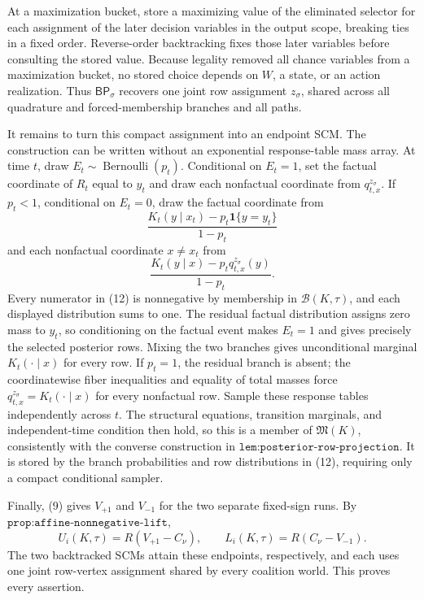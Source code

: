 At a maximization bucket, store a maximizing value of the eliminated selector for each assignment of the later decision variables in the output scope, breaking ties in a fixed order.  Reverse-order backtracking fixes those later variables before consulting the stored value.  Because legality removed all chance variables from a maximization bucket, no stored choice depends on \(W\), a state, or an action realization.  Thus \(\mathsf{BP}_\sigma\) recovers one joint row assignment \(z_\sigma\), shared across all quadrature and forced-membership branches and all paths.

It remains to turn this compact assignment into an endpoint SCM.  The construction can be written without an exponential response-table mass array.  At time \(t\), draw \(E_t\sim\operatorname{Bernoulli}(p_t)\).  Conditional on \(E_t=1\), set the factual coordinate of \(R_t\) equal to \(y_t\) and draw each nonfactual coordinate from \(q^{z_\sigma}_{t,x}\).  If \(p_t<1\), conditional on \(E_t=0\), draw the factual coordinate from
\[
 \frac{K_t(y\mid x_t)-p_t\mathbf 1\{y=y_t\}}{1-p_t}
\]
and each nonfactual coordinate \(x\ne x_t\) from
\[
 \frac{K_t(y\mid x)-p_tq^{z_\sigma}_{t,x}(y)}{1-p_t}.
 \tag{12}
\]
Every numerator in (12) is nonnegative by membership in \(\mathcal B(K,\tau)\), and each displayed distribution sums to one.  The residual factual distribution assigns zero mass to \(y_t\), so conditioning on the factual event makes \(E_t=1\) and gives precisely the selected posterior rows.  Mixing the two branches gives unconditional marginal \(K_t(\cdot\mid x)\) for every row.  If \(p_t=1\), the residual branch is absent; the coordinatewise fiber inequalities and equality of total masses force \(q^{z_\sigma}_{t,x}=K_t(\cdot\mid x)\) for every nonfactual row.  Sample these response tables independently across \(t\).  The structural equations, transition marginals, and independent-time condition then hold, so this is a member of \(\mathfrak M(K)\), consistently with the converse construction in \(\texttt{lem:posterior-row-projection}\).  It is stored by the branch probabilities and row distributions in (12), requiring only a compact conditional sampler.

Finally, (9) gives \(V_{+1}\) and \(V_{-1}\) for the two separate fixed-sign runs.  By \(\texttt{prop:affine-nonnegative-lift}\),
\[
 U_i(K,\tau)=R(V_{+1}-C_\nu),
 \qquad
 L_i(K,\tau)=R(C_\nu-V_{-1}).
\]
The two backtracked SCMs attain these endpoints, respectively, and each uses one joint row-vertex assignment shared by every coalition world.  This proves every assertion.